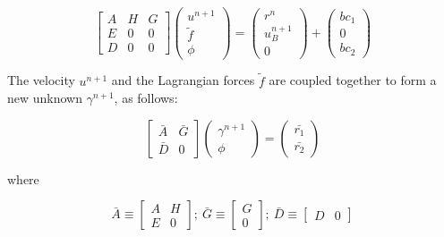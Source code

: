 \begin{equation}
\left[
\begin{matrix}
A & H & G \\
E & 0 & 0 \\
D & 0 & 0
\end{matrix}
\right]
\left(
\begin{matrix}
u^{n+1} \\
\tilde{f} \\
\phi
\end{matrix}
\right)
=
\left(
\begin{matrix}
r^n \\
u_B^{n+1} \\
0
\end{matrix}
\right)
+
\left(
\begin{matrix}
bc_1 \\
0 \\
bc_2
\end{matrix}
\right)
\end{equation}

The velocity $u^{n+1}$ and the Lagrangian forces $\tilde{f}$ are coupled together to form a new unknown $\gamma^{n+1}$, as follows:

\begin{equation}
\left[
\begin{matrix}
\bar{A} & \bar{G} \\
\bar{D} & 0
\end{matrix}
\right]
\left(
\begin{matrix}
\gamma^{n+1} \\
\phi
\end{matrix}
\right)
=
\left(
\begin{matrix}
\bar{r_1} \\
\bar{r_2}
\end{matrix}
\right)
\end{equation}

where

\begin{equation*}
\bar{A} \equiv \left[ \begin{matrix} A & H \\ E & 0 \end{matrix} \right] ;\
\bar{G} \equiv \left[ \begin{matrix} G \\ 0 \end{matrix} \right] ;\
\bar{D} \equiv \left[ \begin{matrix} D & 0 \end{matrix} \right]
\end{equation*}

